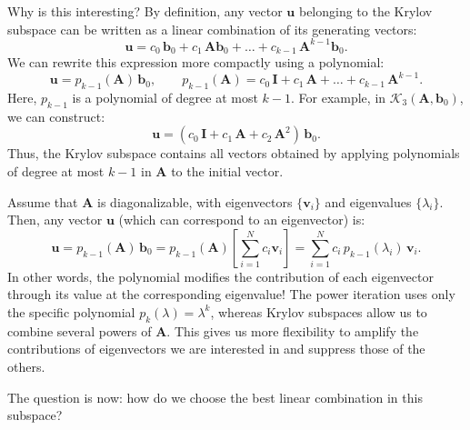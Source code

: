 \documentclass[10pt,aspectratio=169]{beamer}
\begin{document}
\begin{frame}
	Why is this interesting? By definition, any vector $\mathbf u$ belonging to the Krylov subspace can be written as a linear combination of its generating vectors:
	\begin{equation*}
		\mathbf u=c_0\,\mathbf b_0+c_1\,\mathbf A\mathbf b_0+\ldots+c_{k-1}\,\mathbf A^{k-1}\mathbf b_0.
	\end{equation*}
	We can rewrite this expression more compactly using a polynomial:
	\begin{equation*}
		\mathbf u=p_{k-1}(\mathbf A)\,\mathbf b_0,\qquad p_{k-1}(\mathbf A)=c_0\,\mathbf I+c_1\,\mathbf A+\ldots+c_{k-1}\,\mathbf A^{k-1}.
	\end{equation*}
	Here, $p_{k-1}$ is a polynomial of degree at most $k-1$.
	For example, in $\mathcal K_3(\mathbf A,\mathbf b_0)$, we can construct:
	\begin{equation*}
		\mathbf u=(c_0\,\mathbf I+c_1\,\mathbf A+c_2\,\mathbf A^2)\,\mathbf b_0.
	\end{equation*}
	Thus, the Krylov subspace contains all vectors obtained by applying polynomials of degree at most $k-1$ in $\mathbf A$ to the initial vector.
\end{frame}

\begin{frame}
	Assume that $\mathbf A$ is diagonalizable, with eigenvectors $\{\mathbf v_i\}$ and eigenvalues $\{\lambda_i\}$. Then, any vector $\mathbf u$ (which can correspond to an eigenvector) is:
	\begin{equation*}
		\mathbf u=p_{k-1}(\mathbf A)\,\mathbf b_0=p_{k-1}(\mathbf A)\left[\sum_{i=1}^N c_i\mathbf v_i \right]=\sum_{i=1}^N c_i\,p_{k-1}(\lambda_i)\,\mathbf v_i.
	\end{equation*}
	In other words, the polynomial modifies the contribution of each eigenvector through its value at the corresponding eigenvalue!
	The power iteration uses only the specific polynomial $p_k(\lambda)=\lambda^k$, whereas Krylov subspaces allow us to combine several powers of $\mathbf A$. This gives us more flexibility to amplify the contributions of eigenvectors we are interested in and suppress those of the others.
	
	\pause
	\begin{center}
		\Large 
		The question is now: how do we choose the best linear combination in this subspace?
	\end{center}
\end{frame}
\end{document}
